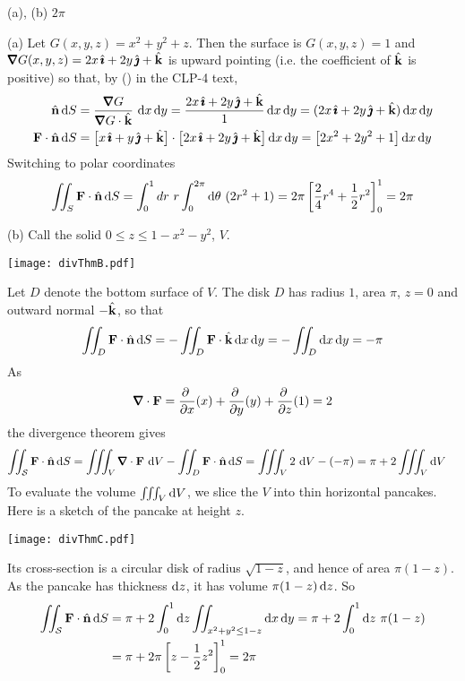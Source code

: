 \begin{answer} 
(a), (b) $2\pi$
\end{answer}

\begin{solution} 
(a)  Let $G(x,y,z) = x^2+y^2+z$. Then the surface is $G(x,y,z)=1$
and $\vnabla G(x,y,z) = 2x\,\hi+2y\,\hj+\hk$ is upward pointing (i.e. the coefficient of $\hat{\mathbf{k}}$ is positive) so that,
by () in the CLP-4 text, 
\begin{align*}
\hn\,\dee{S}&=\frac{\vnabla G}{\vnabla G\cdot\hk}\ \dee{x}\,\dee{y}
=\frac{2x\,\hi+2y\,\hj+\hk}{1}\,\dee{x}\,\dee{y}
=(2x\,\hi+2y\,\hj+\hk)\,\dee{x}\,\dee{y}\\
\vF\cdot\hn\,\dee{S}
&=\big[x\,\hi+y\,\hj+\hk\big]\cdot
          \big[2x\,\hi+2y\,\hj+\hk\big]\,\dee{x}\,\dee{y}
=\big[2x^2+2y^2+1\big]\,\dee{x}\,\dee{y}
\end{align*}
Switching to polar coordinates
\begin{equation*}
\iint_S\mathbf{F}\cdot \hat{\mathbf{n}}\,\mathrm{d}S
=\int_0^1dr\ r\int_0^{2\pi}\mathrm{d}\theta\ (2r^2+1)
=2\pi\left[\frac{2}{4} r^4+\frac{1}{2} r^2\right]_0^1
=2\pi
\end{equation*}

(b) Call the solid $0\le z\le 1-x^2-y^2$, $V$.
\begin{center}
       \texttt{[image: divThmB.pdf]}
\end{center}
Let  $D$ denote the bottom surface of $V$.
The disk $D$ has radius $1$, area $\pi$, $z=0$ and outward normal $-\hat{\mathbf{k}}$, 
so that
\begin{equation*}
\iint_{D}\mathbf{F}\cdot\hat{\mathbf{n}}\,\mathrm{d}S
=-\iint_{D}\mathbf{F}\cdot\hat{\mathbf{k}}\,\mathrm{d}x\,\mathrm{d}y
=-\iint_{D}\mathrm{d}x\,\mathrm{d}y
=-\pi
\end{equation*}
As
\begin{equation*}
\vnabla\cdot\vF
=\pdiff{}{x}(x)
+\pdiff{}{y}(y)
+\pdiff{}{z}(1)
=2
\end{equation*}
the divergence theorem gives
\begin{align*}
\dblInt_{\cS}\vF\cdot\hn\,\dee{S}
&=\tripInt_V\vnabla\cdot\vF\ \dee{V}
-\dblInt_{D}\vF\cdot\hn\,\dee{S}
=\tripInt_V 2\ \dee{V} -(-\pi)
=\pi + 2\tripInt_V \dee{V} 
\end{align*}
To evaluate the volume $\iiint_V \mathrm{d}V$, we slice the $V$ into
thin horizontal pancakes. Here is a sketch of the pancake at height
$z$.
\begin{center}
       \texttt{[image: divThmC.pdf]}
\end{center}
Its cross-section is a circular disk of radius $\sqrt{1-z}$,
and hence of area $\pi(1-z)$. As the pancake has thickness $\mathrm{d}z$, 
it has volume $\pi(1-z)\,\mathrm{d}z$. So
\begin{align*}
\iint_{\mathcal{S}}\mathbf{F}\cdot\hat{\mathbf{n}}\,\mathrm{d}S
&=\pi+2\int_0^1 \mathrm{d}z\iint_{x^2+y^2\le 1-z} \mathrm{d}x\,\mathrm{d}y
=\pi+2\int_0^1 \mathrm{d}z\ \pi(1-z)\\
&=\pi+2\pi\left[z-\frac{1}{2}z^2\right]_0^1
=2\pi
\end{align*}
\end{solution}

